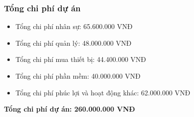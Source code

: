 \subsubsection{Tổng chi phí dự án}
\begin{itemize}
    \item Tổng chi phí nhân sự: 65.600.000 VNĐ
    \item Tổng chi phí quản lý: 48.000.000 VNĐ
    \item Tổng chi phí mua thiết bị: 44.400.000 VNĐ
    \item Tổng chi phí phần mềm: 40.000.000 VNĐ
    \item Tổng chi phí phúc lợi và hoạt động khác: 62.000.000 VNĐ
\end{itemize}
\textbf{Tổng chi phí dự án: 260.000.000 VNĐ}